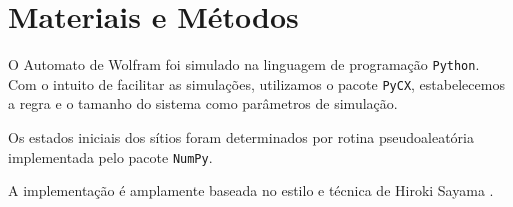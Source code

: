 
\section{Materiais e Métodos}

O Automato de Wolfram foi simulado na linguagem de programação \texttt{Python}.
Com o intuito de facilitar as simulações, utilizamos o pacote \texttt{PyCX},
estabelecemos a regra e o tamanho do sistema como parâmetros de simulação.

\vspace{5mm}
Os estados iniciais dos sítios foram determinados por rotina pseudoaleatória
implementada pelo pacote \texttt{NumPy}.

\vspace{5mm}
A implementação é amplamente baseada no estilo e técnica de Hiroki Sayama
\cite{Sayama:2015:ComplexSystems}.
